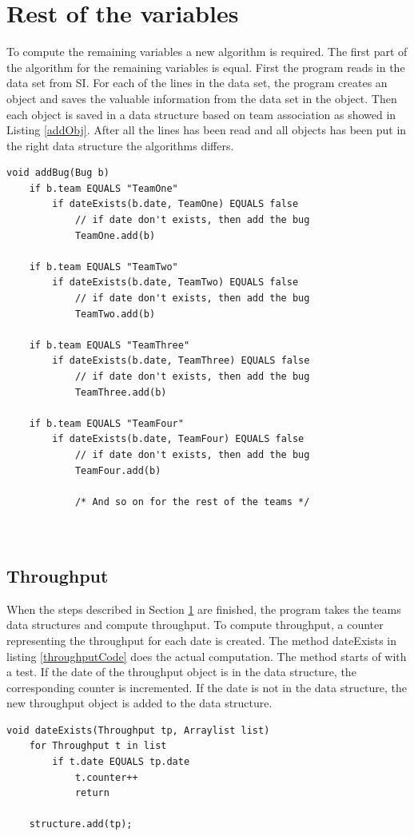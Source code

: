 \documentclass[UKenglish]{ifimaster}  %
\begin{document}
 \section{Rest of the variables}
 \label{sec:rotv}
To compute the remaining variables a new algorithm is required.  The first part of the algorithm for the remaining variables is equal. First the program reads in the data set from SI. For each of the lines in the data set, the program creates an object and saves the valuable information from the data set in the object. Then each object is saved in a data structure based on team association as showed in Listing \ref{addObj}.  After all the lines has been read and all objects has been put in the right data structure the algorithms differs. \begin{lstlisting}[caption=Pseudocode example of how throughput objects are added, label=addObj]
void addBug(Bug b)
	if b.team EQUALS "TeamOne"
		if dateExists(b.date, TeamOne) EQUALS false
			// if date don't exists, then add the bug
			TeamOne.add(b)
			
	if b.team EQUALS "TeamTwo"
		if dateExists(b.date, TeamTwo) EQUALS false
			// if date don't exists, then add the bug
			TeamTwo.add(b)
			
	if b.team EQUALS "TeamThree"
		if dateExists(b.date, TeamThree) EQUALS false 
			// if date don't exists, then add the bug
			TeamThree.add(b)
			
	if b.team EQUALS "TeamFour"
		if dateExists(b.date, TeamFour) EQUALS false
			// if date don't exists, then add the bug
			TeamFour.add(b)
			
			/* And so on for the rest of the teams */
		
	
 \end{lstlisting}
 
%	
 
\subsection{Throughput}
 \label{sec:TP}
When the steps described in Section \ref{sec:rotv} are finished, the program takes the teams data structures and compute throughput. To compute throughput, a counter representing the throughput for each date is created. The method dateExists in listing \ref{throughputCode} does the actual computation. The method starts of with a test. If the date of the throughput object is in the data structure, the corresponding counter is incremented.  If the date is not in the data structure, the new throughput object is added to the data structure. 
\begin{minipage}{\textwidth}
\begin{lstlisting}[caption=Pseudocode example of how throughput is measured, label=throughputCode]
void dateExists(Throughput tp, Arraylist list)
	for Throughput t in list
		if t.date EQUALS tp.date
			t.counter++
			return
			
	structure.add(tp);
\end{lstlisting}
 \end{minipage}
\end{document}
